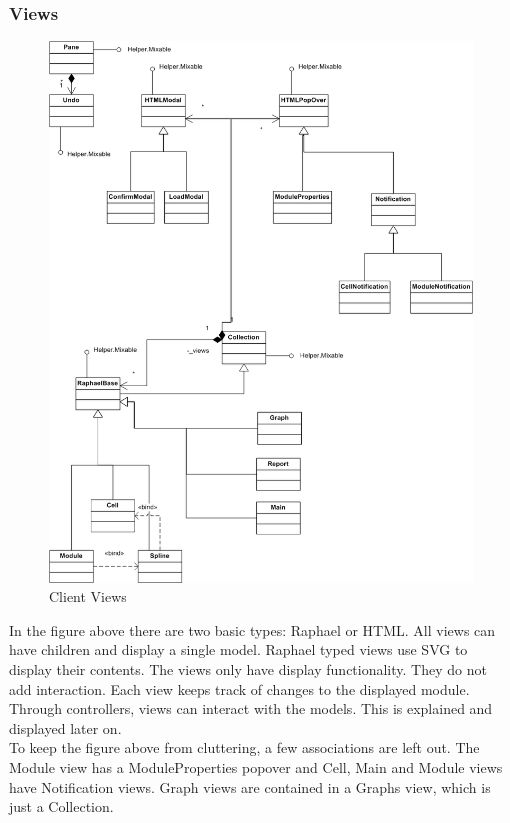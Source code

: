 \documentclass{report}
\begin{document}
				\subsubsection{Views}
					\begin{figure}[h!]
						\begin{center}
							\includegraphics[scale=0.55]{views.png}
							\caption{Client Views}
							\label{fig: cmodels}
						\end{center}
					\end{figure}	

				\clearpage
					In the figure above there are two basic types: Raphael or HTML. All views can have children and display a single model. Raphael typed views use SVG to display their contents. The views only have display functionality. They do not add interaction. Each view keeps track of changes to the displayed module. Through controllers, views can interact with the models. This is explained and displayed later on. \\
					To keep the figure above from cluttering, a few associations are left out. The Module view has a ModuleProperties popover and Cell, Main and Module views have Notification views. Graph views are contained in a Graphs view, which is just a Collection.
\clearpage
\end{document}
